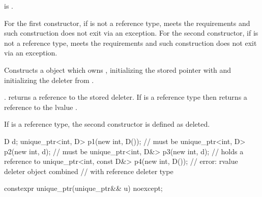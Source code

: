 \begin{itemdescr}
\pnum
\constraints
{} is .

\pnum
\expects
For the first constructor, if  is not a reference type,
 meets the  requirements and
such construction does not exit via an exception.
For the second constructor, if  is not a reference type,
 meets the  requirements and
such construction does not exit via an exception.

\pnum
\effects
Constructs a  object which owns , initializing
the stored pointer with  and initializing the deleter
from .

\pnum
\ensures
{}.
 returns a reference to the stored
deleter. If  is a reference type then 
returns a reference to the lvalue .

\pnum
\remarks
If  is a reference type,
the second constructor is defined as deleted.

\pnum
\begin{example}
\begin{codeblock}
D d;
unique_ptr<int, D> p1(new int, D());        //  must be 
unique_ptr<int, D> p2(new int, d);          //  must be 
unique_ptr<int, D&> p3(new int, d);         //  holds a reference to 
unique_ptr<int, const D&> p4(new int, D()); // error: rvalue deleter object combined
                                            // with reference deleter type
\end{codeblock}
\end{example}
\end{itemdescr}

%
\begin{itemdecl}
constexpr unique_ptr(unique_ptr&& u) noexcept;
\end{itemdecl}

